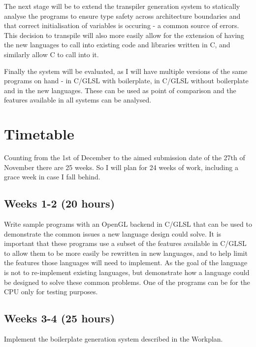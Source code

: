 \documentclass[11pt]{article}
\begin{document}
The next stage will be to extend the transpiler generation system to statically
analyse the programs to ensure type safety across architecture boundaries and
that correct initialisation of variables is occuring - a common source of
errors. This decision to transpile will also more easily allow for the
extension of having the new languages to call into existing code and libraries
written in C, and similarly allow C to call into it.

Finally the system will be evaluated, as I will have multiple versions of the
same programs on hand - in C/GLSL with boilerplate, in C/GLSL without
boilerplate and in the new languages. These can be used as point of comparison
and the features available in all systems can be analysed.




\newpage
\appendix

\section{Timetable}

Counting from the 1st of December to the aimed submission date of the 27th of
November there are 25 weeks. So I will plan for 24 weeks of work, including a
grace week in case I fall behind.

\subsection{Weeks 1-2 (20 hours)}

Write sample programs with an OpenGL backend in C/GLSL that can be used to
demonstrate the common issues a new language design could solve. It is
important that these programs use a subset of the features available in C/GLSL
to allow them to be more easily be rewritten in new languages, and to help
limit the features those languages will need to implement. As the goal of the
language is not to re-implement existing languages, but demonstrate how a
language could be designed to solve these common problems. One of the programs
can be for the CPU only for testing purposes.

\subsection{Weeks 3-4 (25 hours)}

Implement the boilerplate generation system described in the Workplan.
\end{document}
